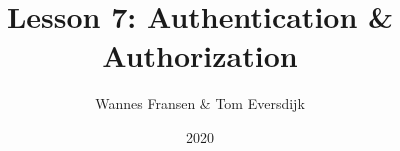 \documentclass{beamer}
\title{Lesson 7: Authentication \& Authorization}
\author{Wannes Fransen \& Tom Eversdijk}
\institute{UC Leuven}
\date{2020}
\begin{document}
\frame{\titlepage}





% 
\end{document}
